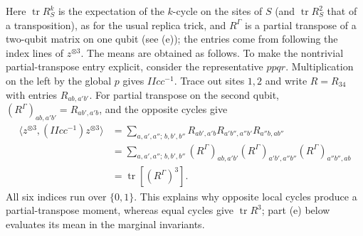 Here \(\operatorname{tr}R_S^k\) is the expectation of the \(k\)-cycle on the sites of \(S\) (and \(\operatorname{tr}R_S^2\)
that of a transposition), as for the usual replica trick, and \(R^\Gamma\) is a partial transpose of a two-qubit matrix on one qubit (see (e)); the entries come from following the index lines
of \(z^{\otimes3}\). The means are obtained as follows.
To make the nontrivial partial-transpose entry explicit, consider the representative
$ppqr$. Multiplication on the left by the global $p$ gives $IIcc^{-1}$.
Trace out sites $1,2$ and write $R=R_{34}$ with entries $R_{ab,a'b'}$.
For partial transpose on the second qubit,
$(R^\Gamma)_{ab,a'b'}=R_{ab',a'b}$, and the opposite cycles give
\[
\begin{aligned}
\langle z^{\otimes3},(IIcc^{-1})z^{\otimes3}\rangle
&=\sum_{a,a',a'';\,b,b',b''}
 R_{ab',a'b}R_{a'b'',a''b'}R_{a''b,ab''}\\
&=\sum_{a,a',a'';\,b,b',b''}
 (R^\Gamma)_{ab,a'b'}(R^\Gamma)_{a'b',a''b''}
 (R^\Gamma)_{a''b'',ab}\\
&=\operatorname{tr}[(R^\Gamma)^3].
\end{aligned}
\]
All six indices run over $\{0,1\}$. This explains why opposite local cycles produce
a partial-transpose moment, whereas equal cycles give $\operatorname{tr}R^3$;
part (e) below evaluates its mean in the marginal invariants.

